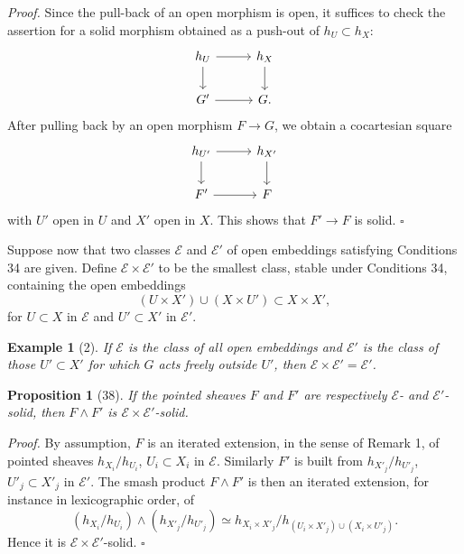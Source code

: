 \documentclass[11pt]{article}
\theoremstyle{deligne}
\newtheorem*{proposition*}{Proposition}
\newtheorem*{example*}{Example}
\newenvironment{proofdel}{\noindent\textit{Proof.}}{\hfill$\square$}
\begin{document}
\begin{proofdel}
Since the pull-back of an open morphism is open, it suffices to check the assertion for a solid morphism obtained as a push-out of \(h_U\subset h_X\):
\[
\begin{tikzcd}[column sep=2.8em,row sep=1.8em]
h_U \arrow[r] \arrow[d] & h_X \arrow[d]\\
G' \arrow[r] & G .
\end{tikzcd}
\]
After pulling back by an open morphism \(F\to G\), we obtain a cocartesian square
\[
\begin{tikzcd}[column sep=2.8em,row sep=1.8em]
h_{U'} \arrow[r] \arrow[d] & h_{X'} \arrow[d]\\
F' \arrow[r] & F
\end{tikzcd}
\]
with \(U'\) open in \(U\) and \(X'\) open in \(X\). This shows that \(F'\to F\) is solid.
\end{proofdel}

Suppose now that two classes \(\mathcal E\) and \(\mathcal E'\) of open embeddings satisfying Conditions 34 are given. Define \(\mathcal E\times\mathcal E'\) to be the smallest class, stable under Conditions 34, containing the open embeddings
\[
(U\times X')\cup(X\times U')\subset X\times X',
\]
for \(U\subset X\) in \(\mathcal E\) and \(U'\subset X'\) in \(\mathcal E'\).

\begin{example*}[2]
If \(\mathcal E\) is the class of all open embeddings and \(\mathcal E'\) is the class of those \(U'\subset X'\) for which \(G\) acts freely outside \(U'\), then \(\mathcal E\times\mathcal E'=\mathcal E'\).
\end{example*}

\begin{proposition*}[38]
If the pointed sheaves \(F\) and \(F'\) are respectively \(\mathcal E\)- and \(\mathcal E'\)-solid, then \(F\wedge F'\) is \(\mathcal E\times\mathcal E'\)-solid.
\end{proposition*}

\begin{proofdel}
By assumption, \(F\) is an iterated extension, in the sense of Remark 1, of pointed sheaves \(h_{X_i}/h_{U_i}\), \(U_i\subset X_i\) in \(\mathcal E\). Similarly \(F'\) is built from \(h_{X'_j}/h_{U'_j}\), \(U'_j\subset X'_j\) in \(\mathcal E'\). The smash product \(F\wedge F'\) is then an iterated extension, for instance in lexicographic order, of
\[
(h_{X_i}/h_{U_i})\wedge(h_{X'_j}/h_{U'_j})
\simeq
h_{X_i\times X'_j}\big/
h_{(U_i\times X'_j)\cup(X_i\times U'_j)}.
\]
Hence it is \(\mathcal E\times\mathcal E'\)-solid.
\end{proofdel}
\end{document}
